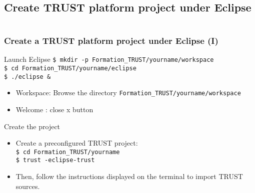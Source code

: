 \documentclass[10pt, hyperref={unicode=true,pdfusetitle, bookmarks=true,bookmarksnumbered=false,bookmarksopen=false, breaklinks=false,pdfborder={0 0 1},backref=true,colorlinks=true,linkcolor=darkblue,pageanchor, urlcolor=darkblue}]{beamer}
\begin{document}
\subsection{{\bf{Create TRUST platform project under Eclipse}}}
\begin{frame}
\begin{columns}[c] 
\tableofcontents[sections={1-4},currentsection, currentsubsection]
\tableofcontents[sections={5-10},currentsection, currentsubsection]
\end{columns}
\end{frame}
\begin{frame}
\frametitle{Create a TRUST platform project under Eclipse (I)}

\begin{exampleblock}{Launch Eclipse}
\texttt{\$ mkdir -p Formation\_TRUST/yourname/workspace}\\
\texttt{\$ cd Formation\_TRUST/yourname/eclipse}\\
\texttt{\$ ./eclipse \&}
%
\begin{itemize}
\item Workspace: Browse the directory \texttt{Formation\_TRUST/yourname/workspace} 
\item Welcome : close x button
\end{itemize}
%
\end{exampleblock}

\begin{exampleblock}{Create the project}
\begin{itemize}
\item Create a preconfigured TRUST project:\\
\texttt{\$ cd Formation\_TRUST/yourname}\\
\texttt{\$ trust -eclipse-trust}

\item Then, follow the instructions displayed on the terminal to import TRUST sources.\\

\end{itemize}
\end{exampleblock}

\end{frame}
\end{document}
